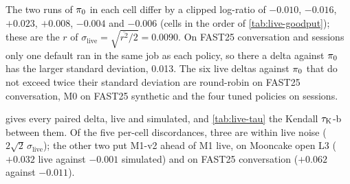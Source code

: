 The two runs of $\piref$ in each cell differ by a clipped log-ratio of $-0.010$, $-0.016$, $+0.023$,
$+0.008$, $-0.004$ and $-0.006$ (cells in the order of \cref{tab:live-goodput}); these are the $r$ of
$\sigma_{\mathrm{live}} = \sqrt{\overline{r^2}/2} = 0.0090$. On FAST25 conversation and sessions only
one default ran in the same job as each policy, so there a delta against $\piref$ has the larger
standard deviation, 0.013. The six live deltas against $\piref$ that do not exceed twice their
standard deviation are round-robin on FAST25 conversation, M0 on FAST25 synthetic and the four tuned
policies on sessions.

 gives every paired delta, live and simulated, and \cref{tab:live-tau} the
Kendall $\kendall$-b between them. Of the five per-cell discordances, three are within live noise
($2\sqrt{2}\,\sigma_{\mathrm{live}}$); the other two put M1-v2 ahead of M1 live, on Mooncake open L3
($+0.032$ live against $-0.001$ simulated) and on FAST25 conversation ($+0.062$ against $-0.011$).

\begin{table}[tbp]
  \centering
  \caption{Live GPU validation: paired deltas, live (simulated at $\krep = 0$), as the clipped
    log-ratio of the headline. Top: against $\piref$, the mean of its runs in the same job. Bottom:
    against tuned . One run per cell and policy; live noise $\sigma_{\mathrm{live}} =
    0.0090$ per run.}
  \label{tab:live-deltas}
  
  \par\medskip
  
\end{table}

\begin{table}[tbp]
  \centering
  \caption{Kendall $\kendall$-b between simulated and live deltas against $\piref$ per cell, at the
    registered $\krep = 0$ and in the three registered sensitivities, and the discordant policy pairs.
    ``Within noise'': the live difference is at most $2\sqrt{2}\,\sigma_{\mathrm{live}}$.}
  \label{tab:live-tau}
  
\end{table}

